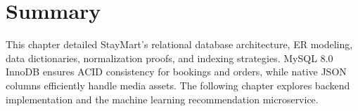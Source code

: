 \section{Summary}
This chapter detailed StayMart's relational database architecture, ER modeling, data dictionaries, normalization proofs, and indexing strategies. MySQL 8.0 InnoDB ensures ACID consistency for bookings and orders, while native JSON columns efficiently handle media assets. The following chapter explores backend implementation and the machine learning recommendation microservice.
